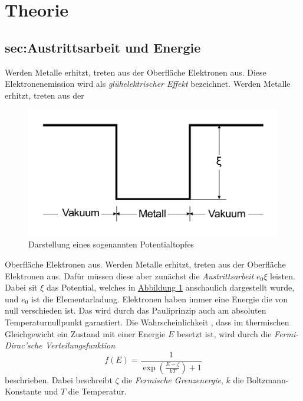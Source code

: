 \section{Theorie}
\label{sec:Theorie}

\subsection{sec:Austrittsarbeit und Energie}
\label{sec:Austrittsarbeit und Energie}
Werden Metalle erhitzt, treten aus der Oberfläche Elektronen aus.
Diese Elektronenemission wird als \textit{glühelektrischer Effekt} bezeichnet.
Werden Metalle erhitzt, treten aus der
\begin{figure}
    \caption{Darstellung eines sogenannten Potentialtopfes}\label{fig:Potentialtopf}
    \includegraphics[width=\linewidth]{pictures/Potentialtopf.pdf}
\end{figure} 
Oberfläche Elektronen aus.
Werden Metalle erhitzt, treten aus der Oberfläche Elektronen aus.
Dafür müssen diese aber zunächst die \textit{Austrittsarbeit} $e_0 \xi$ leisten.
Dabei sit $\xi$ das Potential, welches in \hyperref[fig:Potentialtopf]{Abbildung \ref{fig:Potentialtopf}} anschaulich dargestellt wurde, und
$e_0$ ist die Elementarladung.
Elektronen haben immer eine Energie die von null verschieden ist.
Das wird durch das Pauliprinzip auch am absoluten Temperaturnullpunkt garantiert.
Die Wahrscheinlichkeit , dass im thermischen Gleichgewicht ein Zustand mit einer Energie $E$ besetzt ist, wird durch die
\textit{Fermi-Dirac'sche Verteilungsfunktion}
\begin{equation}
    f(E)=\frac{1}{\exp \left(\frac{E-\zeta}{k T}\right)+1}
\end{equation}
beschrieben. Dabei beschreibt $\zeta$ die \textit{Fermische Grenzenergie}, $k$ die Boltzmann-Konstante und $T$ die Temperatur.


